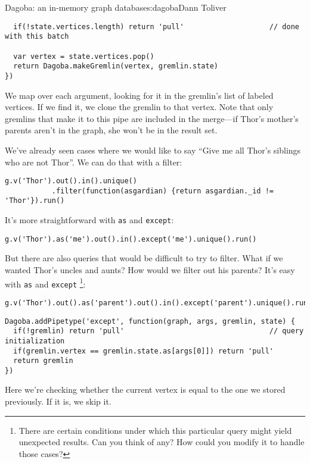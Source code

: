\begin{aosachapter}{Dagoba: an in-memory graph database}{s:dagoba}{Dann Toliver}
\begin{verbatim}
  if(!state.vertices.length) return 'pull'                    // done with this batch

  var vertex = state.vertices.pop()
  return Dagoba.makeGremlin(vertex, gremlin.state)
})
\end{verbatim}

We map over each argument, looking for it in the gremlin's list of
labeled vertices. If we find it, we clone the gremlin to that vertex.
Note that only gremlins that make it to this pipe are included in the
merge---if Thor's mother's parents aren't in the graph, she won't be in
the result set.

\label{except}

We've already seen cases where we would like to say ``Give me all Thor's
siblings who are not Thor''. We can do that with a filter:

\begin{verbatim}
g.v('Thor').out().in().unique()
           .filter(function(asgardian) {return asgardian._id != 'Thor'}).run()
\end{verbatim}

It's more straightforward with \texttt{as} and \texttt{except}:

\begin{verbatim}
g.v('Thor').as('me').out().in().except('me').unique().run()
\end{verbatim}

But there are also queries that would be difficult to try to filter.
What if we wanted Thor's uncles and aunts? How would we filter out his
parents? It's easy with \texttt{as} and \texttt{except} \footnote{There
  are certain conditions under which this particular query might yield
  unexpected results. Can you think of any? How could you modify it to
  handle those cases?}:

\begin{verbatim}
g.v('Thor').out().as('parent').out().in().except('parent').unique().run()
\end{verbatim}

\begin{verbatim}
Dagoba.addPipetype('except', function(graph, args, gremlin, state) {
  if(!gremlin) return 'pull'                                  // query initialization
  if(gremlin.vertex == gremlin.state.as[args[0]]) return 'pull'
  return gremlin
})
\end{verbatim}

Here we're checking whether the current vertex is equal to the one we
stored previously. If it is, we skip it.


\end{aosachapter}
